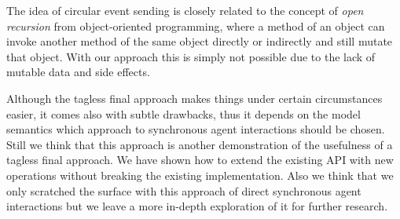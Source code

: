 The idea of circular event sending is closely related to the concept of \textit{open recursion} from object-oriented programming, where a method of an object can invoke another method of the same object directly or indirectly and still mutate that object. With our approach this is simply not possible due to the lack of mutable data and side effects. 

Although the tagless final approach makes things under certain circumstances easier, it comes also with subtle drawbacks, thus it depends on the model semantics which approach to synchronous agent interactions should be chosen. Still we think that this approach is another demonstration of the usefulness of a tagless final approach. We have shown how to extend the existing API with new operations without breaking the existing implementation. Also we think that we only scratched the surface with this approach of direct synchronous agent interactions but we leave a more in-depth exploration of it for further research.